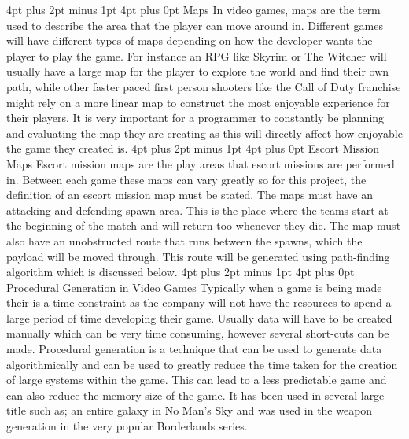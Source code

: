 \documentclass[12pt,a4paper,oneside]{book}
\makeatletter
\renewcommand\section{\@startsection {section}{1}{0mm} %
                               {4pt plus 2pt minus 1pt} %
                               {4pt plus 0pt} %
                               {\bfseries}}
\makeatother
\begin{document}
\section{Maps}
In video games, maps are the term used to describe the area that the player can move around in. Different games will have different types of maps depending on how the developer wants the player to play the game. For instance an RPG like Skyrim or The Witcher will usually have a large map for the player to explore the world and find their own path, while other faster paced first person shooters like the Call of Duty franchise might rely on a more linear map to construct the most enjoyable experience for their players. It is very important for a programmer to constantly be planning and evaluating the map they are creating as this will directly affect how enjoyable the game they created is.
\vspace{5mm} 
\newline
\section{Escort Mission Maps}
Escort mission maps are the play areas that escort missions are performed in. Between each game these maps can vary greatly so for this project, the definition of an escort mission map must be stated. The maps must have an attacking and defending spawn area. This is the place where the teams start at the beginning of the match and will return too whenever they die. The map must also have an unobstructed route that runs between the spawns, which the payload will be moved through. This route will be generated using path-finding algorithm which is discussed below.
\vspace{5mm} 
\newline 
\section{Procedural Generation in Video Games}
Typically when a game is being made their is a time constraint as the company will not have the resources to spend a large period of time developing their game. Usually data will have to be created manually which can be very time consuming, however several short-cuts can be made.
\vspace{5mm} 
\newline
Procedural generation is a technique that can be used  to generate data algorithmically and can be used to greatly reduce the time taken for the creation of large systems within the game. This can lead to a less predictable game and can also reduce the memory size of the game. It has been used in several large title such as; an entire galaxy in No Man's Sky and was used in the weapon generation in the very popular Borderlands series.  
\end{document}
